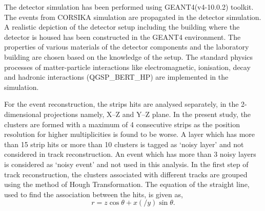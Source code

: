 \documentclass[a4paper,12pt,twoside]{article}
\begin{document}
The detector simulation has been performed using GEANT4(v4-10.0.2) toolkit. The events from CORSIKA simulation are propagated in the detector simulation. A realistic depiction of the detector setup including the building where the detector is housed has been constructed in the GEANT4 environment. The properties of various materials of the detector components and the laboratory building are chosen based on the knowledge of the setup. The standard physics processes of matter-particle interactions like electromagnetic, ionisation, decay and hadronic interactions (QGSP\_BERT\_HP) are implemented in the simulation.

For the event reconstruction, the strips hits are analysed separately, in the 2-dimensional projections namely, \mbox{X--Z} and \mbox{Y--Z} plane. In the present study, the clusters are formed with a maximum of 4 consecutive strips as the position resolution for higher multiplicities is found to be worse. A layer which has more than 15 strip hits or more than 10 clusters is tagged as `noisy layer' and not considered in track reconstruction. An event which has more than 3 noisy layers is considered as `noisy event' and not used in this analysis. In the first step of track reconstruction, the clusters associated with different tracks are grouped using the method of Hough Transformation\cite{hought}. The equation of the straight line, used to find the association between the hits, is given as,
\begin{equation}
  r=z\cos\theta+x\left(/y\right)\sin\theta. \label{eq:hough}
\end{equation}
\end{document}
